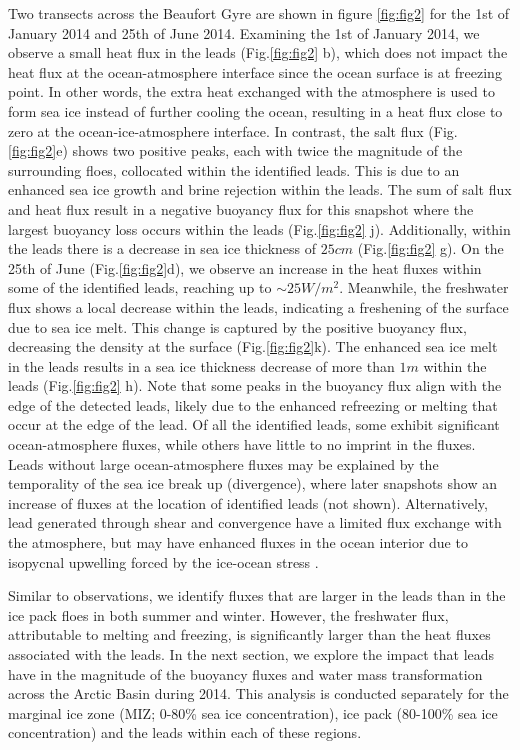 \documentclass[lineno,sn-basic]{sn-jnl}%
\begin{document}
Two transects across the Beaufort Gyre are shown in figure \ref{fig:fig2} for the 1st of January 2014 and 25th of June 2014.
Examining the 1st of January 2014, we observe a small heat flux in the leads (Fig.\ref{fig:fig2} b), which does not impact the heat flux at the ocean-atmosphere interface since the ocean surface is at freezing point. 
In other words, the extra heat exchanged with the atmosphere is used to form sea ice instead of further cooling the ocean, resulting in a heat flux close to zero at the ocean-ice-atmosphere interface.
In contrast, the salt flux (Fig.\ref{fig:fig2}e) shows two positive peaks, each with twice the magnitude of the surrounding floes, collocated within the identified leads. This is due to an enhanced sea ice growth and brine rejection within the leads. 
The sum of salt flux and heat flux result in a negative buoyancy flux for this snapshot where the largest buoyancy loss occurs within the leads (Fig.\ref{fig:fig2} j). Additionally, within the leads there is a decrease in sea ice thickness of $25cm$ (Fig.\ref{fig:fig2} g). 
On the 25th of June (Fig.\ref{fig:fig2}d), we observe an increase in the heat fluxes within some of the identified leads, reaching up to $\sim 25 W/m^2$. Meanwhile, the freshwater flux shows a local decrease within the leads, indicating a freshening of the surface due to sea ice melt. This change is captured by the positive buoyancy flux, decreasing the density at the surface (Fig.\ref{fig:fig2}k). The enhanced sea ice melt in the leads results in a sea ice thickness decrease of more than $1m$ within the leads  (Fig.\ref{fig:fig2} h). Note that some peaks in the buoyancy flux align with the edge of the detected leads, likely due to the enhanced refreezing or melting that occur at the edge of the lead. 
Of all the identified leads, some exhibit significant ocean-atmosphere fluxes, while others have little to no imprint in the fluxes. Leads without large ocean-atmosphere fluxes may be explained by the temporality of the sea ice break up (divergence), where later snapshots show an increase of fluxes at the location of identified leads (not shown). Alternatively, lead generated through shear and convergence have a limited flux exchange with the atmosphere, but may have enhanced fluxes in the ocean interior due to isopycnal upwelling forced by the ice-ocean stress \citep{Bourgault_flux_lkf_2020}.

Similar to observations, we identify fluxes that are larger in the leads than in the ice pack floes in both summer and winter. However, the freshwater flux, attributable to melting and freezing, is significantly larger than the heat fluxes associated with the leads. In the next section, we explore the impact that leads have in the magnitude of the buoyancy fluxes and water mass transformation across the Arctic Basin during 2014. This analysis is conducted separately for the marginal ice zone (MIZ; 0-80\% sea ice concentration), ice pack (80-100\% sea ice concentration) and the leads within each of these regions. 
\end{document}
